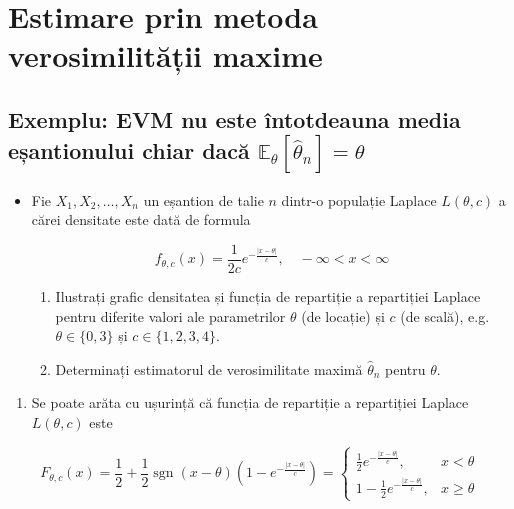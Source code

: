 \documentclass[
]{article}
\providecommand{\tightlist}{%
  \setlength{\itemsep}{0pt}\setlength{\parskip}{0pt}}
\newenvironment{frshaded*}{%
  \def\FrameCommand{\fboxrule=\FrameRule\fboxsep=\FrameSep \fcolorbox{framecolor}{shadecolor1}}%
  \MakeFramed {\advance\hsize-\width \FrameRestore}}%
{\endMakeFramed}
\newenvironment{rmdblock}[1]
  {\begin{frshaded*}
  \begin{itemize}
  \renewcommand{\labelitemi}{
    \raisebox{-.7\height}[0pt][0pt]{
      {\setkeys{Gin}{width=2em,keepaspectratio}\texttt{[image: images/icons/\#1]}}
    }
  }
  \item
  }
  {
  \end{itemize}
  \end{frshaded*}
  }
\newcounter{exo}[section]
\newenvironment{rmdexercise}
  {\begin{rmdblock}{exercise}}
  {\end{rmdblock}}
\begin{document}
\hypertarget{estimare-prin-metoda-verosimilitux103ux21bii-maxime}{%
\section{Estimare prin metoda verosimilității
maxime}\label{estimare-prin-metoda-verosimilitux103ux21bii-maxime}}

\hypertarget{exemplu-evm-nu-este-uxeentotdeauna-media-eux219antionului-chiar-dacux103-mathbbe_thetahattheta_n-theta}{%
\subsection{\texorpdfstring{Exemplu: EVM nu este întotdeauna media
eșantionului chiar dacă
\(\mathbb{E}_{\theta}[\hat{\theta}_n] = \theta\)}{Exemplu: EVM nu este întotdeauna media eșantionului chiar dacă \textbackslash mathbb\{E\}\_\{\textbackslash theta\}{[}\textbackslash hat\{\textbackslash theta\}\_n{]} = \textbackslash theta}}\label{exemplu-evm-nu-este-uxeentotdeauna-media-eux219antionului-chiar-dacux103-mathbbe_thetahattheta_n-theta}}

\begin{rmdexercise}
Fie \(X_1,X_2,\ldots,X_n\) un eșantion de talie \(n\) dintr-o populație
Laplace \(L(\theta, c)\) a cărei densitate este dată de formula

\[
  f_{\theta, c}(x) = \frac{1}{2c}e^{-\frac{|x-\theta|}{c}}, \quad -\infty<x<\infty
\]

\begin{enumerate}
\def\labelenumi{\alph{enumi})}
\item
  Ilustrați grafic densitatea și funcția de repartiție a repartiției
  Laplace pentru diferite valori ale parametrilor \(\theta\) (de
  locație) și \(c\) (de scală), e.g.~\(\theta\in\{0, 3\}\) și
  \(c\in\{1,2,3,4\}\).
\item
  Determinați estimatorul de verosimilitate maximă \(\hat{\theta}_n\)
  pentru \(\theta\).
\end{enumerate}
\end{rmdexercise}

\begin{enumerate}
\def\labelenumi{\alph{enumi})}
\tightlist
\item
  Se poate arăta cu ușurință că funcția de repartiție a repartiției
  Laplace \(L(\theta, c)\) este
\end{enumerate}

\[
  F_{\theta, c}(x) = \frac{1}{2} + \frac{1}{2}\operatorname{sgn}(x-\theta)\left(1-e^{-\frac{|x-\theta|}{c}}\right) = \left\{\begin{array}{ll}
    \frac{1}{2}e^{-\frac{|x-\theta|}{c}}, & x<\theta\\
    1-\frac{1}{2}e^{-\frac{|x-\theta|}{c}}, & x\geq\theta
  \end{array}\right.
\]
\end{document}
